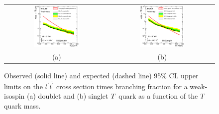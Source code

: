 \begin{figure}[htbp]
\begin{center}
\begin{tabular}{cc}
\includegraphics[width=0.45\textwidth]{results/figures/htx/lim_doublet.eps} &
\includegraphics[width=0.45\textwidth]{results/figures/htx/lim_singlet.eps} \\
(a) & (b) \\
\end{tabular}
\caption{Observed (solid line) and expected (dashed line) 95\% CL upper limits on the $t^\prime \bar{t^\prime}$ cross section times branching fraction
for a weak-isospin (a) doublet and (b) singlet $\T$ quark  as a function of the $\T$ quark mass. 
\label{fig:limits1D_htx}}
\end{center}
\end{figure}

